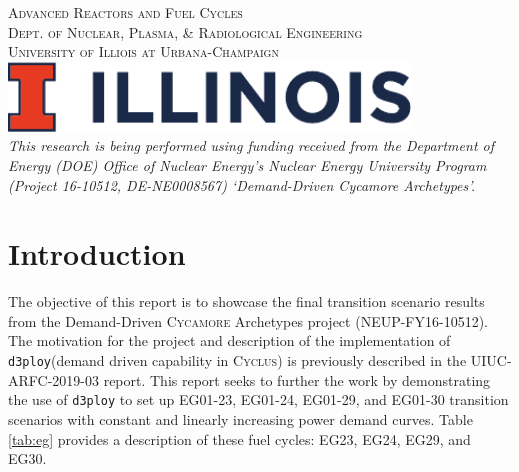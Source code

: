 \documentclass[11pt]{article}
\newcommand{\Cyclus}{\textsc{Cyclus}\xspace}%
\newcommand{\Cycamore}{\textsc{Cycamore}\xspace}%
\newcommand{\deploy}{\texttt{d3ploy}\xspace}%
\begin{document}
\begin{titlepage}

    \textsc{\LARGE Advanced Reactors and Fuel Cycles}\\[0.25cm] %

    \textsc{\large Dept. of Nuclear, Plasma, \& Radiological Engineering}\\%

    \textsc{\large University of Illiois at Urbana-Champaign}\\ %




    \vspace{0.5cm}
    \includegraphics[width=0.8\textwidth]{illinois}\\[1cm] %


    \textit{This research is being performed using funding received from the 
    Department of Energy (DOE) Office of Nuclear Energy’s Nuclear Energy 
    University Program (Project 16-10512, DE-NE0008567) `Demand-Driven Cycamore 
    Archetypes’.} 

\end{titlepage}


\tableofcontents

\pagebreak

\section{Introduction}
The objective of this report is to showcase the final transition 
scenario results from the Demand-Driven \Cycamore Archetypes project 
(NEUP-FY16-10512). 
The motivation for the project and description of the implementation 
of \deploy (demand driven capability in \Cyclus) is previously 
described in the UIUC-ARFC-2019-03 report. 
This report seeks to further the work by demonstrating the use of 
\deploy to set up EG01-23, EG01-24, EG01-29, and EG01-30 
transition scenarios with constant and linearly increasing 
power demand curves.
Table \ref{tab:eg} provides a description of these fuel cycles:
EG23, EG24, EG29, and EG30. 
\end{document}
